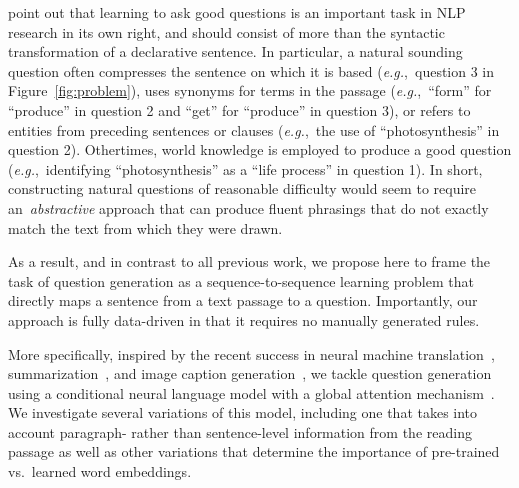 \documentclass[11pt,a4paper]{article}
\newcommand{\eg}{{\em e.g.}}
\begin{document}

 point out that learning to ask good questions is an important task in NLP research in its own right, and should consist of more than the syntactic transformation of a declarative sentence.
In particular, a natural sounding question often compresses the sentence
on which it is based (\eg,~question 3 in Figure~\ref{fig:problem}), uses synonyms for terms in the passage (\eg,~``form'' for ``produce'' in question 2 and ``get'' for ``produce'' in question 3), or refers to entities from preceding sentences or clauses (\eg,~the use of ``photosynthesis'' in question 2).
%
Othertimes, world knowledge is employed to produce a good question
(\eg,~identifying ``photosynthesis'' as a ``life process'' in question 1).
%
In short, constructing natural questions of reasonable difficulty would seem to require an~\emph{abstractive} approach that can produce fluent phrasings that do not exactly match the text from which they were drawn.

As a result, and in contrast to all previous work, we propose here to
frame the task of question generation as a
sequence-to-sequence learning problem that directly maps a sentence  from a text passage to a question. Importantly, our approach is
fully data-driven in that it requires no manually generated rules.  

More specifically, inspired by the recent success in neural machine translation~\cite{sutskever2014sequence, bahdanau2014neural}, summarization~\cite{rush2015namas, iyer2016code}, and image caption generation~\cite{xu2015show}, we tackle question generation using a conditional neural language model with a global attention mechanism~\cite{luong2015effective}. 
We investigate several variations of this model, including one that takes into account paragraph- rather than sentence-level information from the reading passage as well as other variations that determine the importance of pre-trained vs.\ learned word embeddings. 
\end{document}
